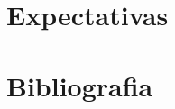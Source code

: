 \documentclass[
	12pt,				%
	openright,			%
	oneside,
	a4paper,			%
	english,			%
	french,				%
	spanish,			%
	brazil				%
	]{abntex2}
\begin{document}
\chapter[Expectativas]{Expectativas}



\postextual

\chapter[Bibliografia]{Bibliografia}




\end{document}
